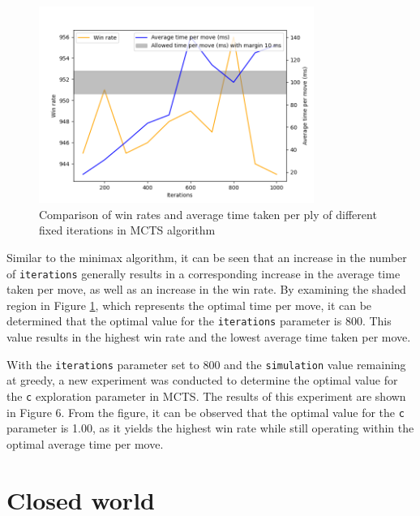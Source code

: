 \begin{figure}[h]
  \centering
  \captionsetup{justification=centering}
  \includegraphics[width=0.8\textwidth]{../img/mcts_iterations_openworld.png}
  \caption{Comparison of win rates and average time taken per ply of different fixed iterations in MCTS algorithm}
  \label{mctsOWIterations}
\end{figure}

Similar to the minimax algorithm, it can be seen that an increase in the number of \texttt{iterations} generally results in a corresponding increase in the average time taken per move, as well as an increase in the win rate. By examining the shaded region in Figure \ref{mctsOWIterations}, which represents the optimal time per move, it can be determined that the optimal value for the \texttt{iterations} parameter is 800. This value results in the highest win rate and the lowest average time taken per move.

With the \texttt{iterations} parameter set to 800 and the \texttt{simulation} value remaining at greedy, a new experiment was conducted to determine the optimal value for the \texttt{c} exploration parameter in MCTS. The results of this experiment are shown in Figure 6. From the figure, it can be observed that the optimal value for the \texttt{c} parameter is 1.00, as it yields the highest win rate while still operating within the optimal average time per move.

\section{Closed world}
